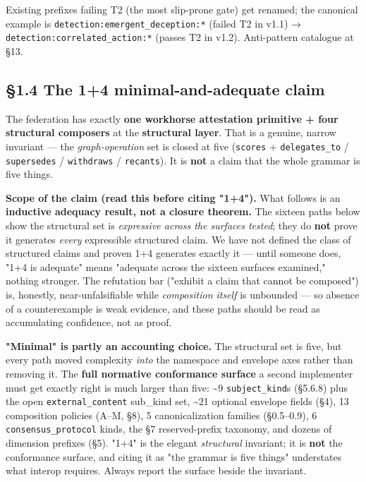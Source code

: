 \documentclass[11pt]{article}
\begin{document}
Existing prefixes failing T2 (the most slip-prone gate) get renamed; the canonical example is \texttt{detection:emergent\_deception:*} (failed T2 in v1.1) → \texttt{detection:correlated\_action:*} (passes T2 in v1.2). Anti-pattern catalogue at §13.


\subsection*{§1.4 The 1+4 minimal-and-adequate claim}


The federation has exactly \textbf{one workhorse attestation primitive + four structural composers} at the \textbf{structural layer}. That is a genuine, narrow invariant — the \textit{graph-operation} set is closed at five (\texttt{scores} + \texttt{delegates\_to} / \texttt{supersedes} / \texttt{withdraws} / \texttt{recants}). It is \textbf{not} a claim that the whole grammar is five things.


\textbf{Scope of the claim (read this before citing "1+4").} What follows is an \textbf{inductive adequacy result, not a closure theorem.} The sixteen paths below show the structural set is \textit{expressive across the surfaces tested}; they do \textbf{not} prove it generates \textit{every} expressible structured claim. We have not defined the class of structured claims and proven 1+4 generates exactly it — until someone does, "1+4 is adequate" means "adequate across the sixteen surfaces examined," nothing stronger. The refutation bar ("exhibit a claim that cannot be composed") is, honestly, near-unfalsifiable while \textit{composition itself} is unbounded — so absence of a counterexample is weak evidence, and these paths should be read as accumulating confidence, not as proof.


\textbf{"Minimal" is partly an accounting choice.} The structural set is five, but every path moved complexity \textit{into} the namespace and envelope axes rather than removing it. The \textbf{full normative conformance surface} a second implementer must get exactly right is much larger than five: \textasciitilde{}9 \texttt{subject\_kind}s (§5.6.8) plus the open \texttt{external\_content} sub\_kind set, \textasciitilde{}21 optional envelope fields (§4), 13 composition policies (A–M, §8), 5 canonicalization families (§0.5–0.9), 6 \texttt{consensus\_protocol} kinds, the §7 reserved-prefix taxonomy, and dozens of dimension prefixes (§5). "1+4" is the elegant \textit{structural} invariant; it is \textbf{not} the conformance surface, and citing it as "the grammar is five things" understates what interop requires. Always report the surface beside the invariant.
\end{document}
